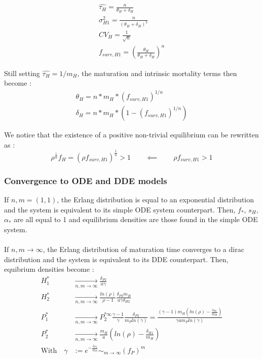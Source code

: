 \documentclass[12pt,a4paper,onecolumn]{article}
\begin{document}
\begin{align}
\hat{\tau_{H}} = \frac{n}{\theta_{H} + \delta_{H}} \nonumber \\
\sigma^2_{H1} = \frac{n}{(\theta_{H} + \delta_{H})^2} \\
CV_{H} = \frac{1}{\sqrt{n}} \\
f_{surv,H1} = (\frac{\theta_{H}}{\theta_{H} + \delta_{H}})^n
\end{align}

Still setting $\hat{\tau_{H}} = 1/m_H$, the maturation and intrinsic mortality terms then become :
\begin{equation}
\begin{alignedat}{2}
\theta_{H} = n * m_{H}* (f_{surv,H1})^{1/n} \\
\delta_{H} = n* m_{H}* (1-(f_{surv,H1})^{1/n})
\end{alignedat}
\end{equation}

We notice that the existence of a positive non-trivial equilibrium can be rewritten as :
$$\rho^{\frac{1}{n}}f_H = (\rho f_{surv,H1})^{\frac{1}{n}} > 1 \qquad \impliedby \qquad \rho f_{surv,H1} > 1$$

\subsubsection{Convergence to ODE and DDE models}
If $n,m = (1,1)$, the Erlang distribution is equal to an exponential distribution and the system is equivalent to its simple ODE system counterpart. Then, $f_*$, $s_H$, $\alpha_*$ are all equal to 1 and equilibrium densities are those found in the simple ODE system. \\ \\

If $n,m\to\infty$, the Erlang distribution of maturation time converges to a dirac distribution and the system is equivalent to its DDE counterpart. Then, equibrium densities become : 
\begin{align}
H_1^* & \xrightarrow[n,m\to\infty]{} \frac{\delta_{P2}}{a\gamma} \nonumber \\
H_2^* & \xrightarrow[n,m\to\infty]{} \frac{ln(\rho)}{\rho-1} \frac{\delta_{P2} m_H}{a \gamma \delta_{H2}} \nonumber \\
P_1^* & \xrightarrow[n,m\to\infty]{} P_2^{* \infty} \frac{\gamma -1}{\gamma} \frac{\delta_{P2}}{m_P ln(\gamma)} = \frac{(\gamma-1)m_H(ln(\rho) - \frac{\delta_{H1}}{m_H})}{\gamma  a  m_P   ln(\gamma)} \\
P_2^*&  \xrightarrow[n,m\to\infty]{} \frac{m_H}{a}(ln(\rho) - \frac{\delta_{H1}}{m_H}) \nonumber  \\
\text{With} \quad \gamma & := e^{-\frac{\delta_{P1}}{m_P}} \sim_{m \to \infty} (f_P)^m \nonumber
\end{align}
\end{document}
